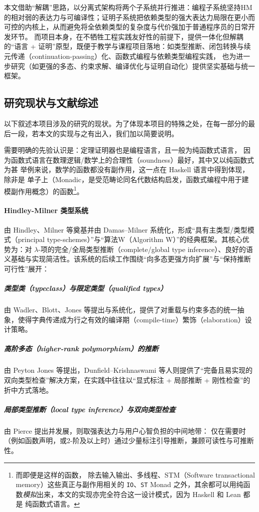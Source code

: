 \documentclass[a4paper, 11pt]{article}
\theoremstyle{remark}\newtheorem*{remark}{Remark}
\theoremstyle{definition}\newtheorem*{definition}{Definition}
\begin{document}
本文借助“解耦”思路，以分离式架构将两个子系统并行推进：编程子系统坚持HM的相对弱的表达力与可编译性；证明子系统把依赖类型的强大表达力局限在更小而可控的内核上，从而避免将全依赖类型的复杂度与代价强加于普通程序员的日常开发环节。
而项目本身，在不牺牲工程实践友好性的前提下，提供一体化但解耦的“语言 + 证明”原型，既便于教学与课程项目落地：如类型推断、闭包转换与续元传递（continuation-passing）化、函数式编程与依赖类型编程实践，
也为进一步研究（如更强的多态、约束求解、编译优化与证明自动化）提供坚实基础与统一框架。

\subsection{研究现状与文献综述}
以下叙述本项目涉及的研究的现状。为了体现本项目的特殊之处，在每一部分的最后一段，若本文的实现与之有出入，我们加以简要说明。

需要明确的先验认识是：定理证明器也是编程语言，且一般为纯函数式语言，
因为函数式语言在数理逻辑/数学上的合理性（soundness）最好，其中又以纯函数式为甚
举例来说，数学的函数都没有副作用，这一点在 Haskell 语言中得到体现，除非是
单子上（Monadic，是受范畴论同名代数结构启发，函数式编程中用于建模副作用概念）的函数\footnote{
  而即便是这样的函数，
  除去输入输出、多线程、STM（Software transactional memory）这些真正与副作用相关的 \texttt{IO}、\texttt{ST} Monad 之外，其余都可以用纯函数\emph{模拟}出来，本文的实现亦完全符合这一设计模式，因为 Haskell 和 Lean 都是
  纯函数式语言。
}。
\paragraph{Hindley-Milner 类型系统} 由 Hindley、Milner 等奠基并由 Damas–Milner 系统化，形成“具有主类型/类型模式（principal type-schemes）”与“算法W（Algorithm W）”的经典框架。其核心优势为：对 $\lambda$-项的完全/全局类型推断（complete/global type inference）、良好的语义基础与实现简洁性。该系统的后续工作围绕“向多态更强方向扩展”与“保持推断可行性”展开：
\subparagraph{类型类（typeclass）与限定类型（qualified types）} 由 Wadler、Blott、Jones 等提出与系统化，提供了对重载与约束多态的统一抽象，使得字典传递成为行之有效的编译期（compile-time）繁饰（elaboration）设计策略。
\subparagraph{高阶多态（higher-rank polymorphism）的推断} 由 Peyton Jones 等提出，Dunfield–Krishnaswami 等人则提供了“完备且易实现的双向类型检查”解决方案，在实践中往往以“显式标注 + 局部推断 + 刚性检查”的折中方式落地。
\subparagraph{局部类型推断（local type inference）与双向类型检查} 由 Pierce 提出并发展，则取强表达力与用户心智负担的中间地带：
仅在需要时（例如函数声明，或2-阶及以上时）通过少量标注引导推断，兼顾可读性与可推断性。
\end{document}
